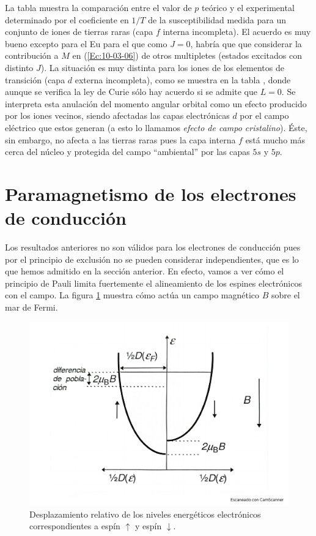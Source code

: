 La tabla muestra la comparación entre el valor de $p$ teórico y el experimental determinado por el coeficiente en $1/T$ de la susceptibilidad medida para un conjunto de iones de tierras raras (capa $f$ interna incompleta). El acuerdo es muy  bueno excepto para el Eu para el que como $J=0$, habría que que considerar la contribución a $M$ en (\ref{Ec:10-03-06}) de otros multipletes (estados excitados con distinto $J$). La situación es muy distinta para los iones de los elementos de transición (capa $d$ externa incompleta), como se muestra en la tabla , donde aunque se verifica la ley de Curie sólo hay acuerdo si se admite que $L=0$. Se interpreta esta anulación del momento angular orbital como un efecto producido por los iones vecinos, siendo afectadas las capas electrónicas $d$ por el campo eléctrico que estos generan (a esto lo llamamos \textit{efecto de campo cristalino}). Éste, sin embargo, no afecta a las tierras raras pues la capa interna $f$ está mucho más cerca del núcleo y protegida del campo ``ambiental'' por las capas $5s$ y $5p$.


\section{Paramagnetismo de los electrones de conducción}

Los resultados anteriores no son válidos para los electrones de conducción pues por el principio de exclusión no se pueden considerar independientes, que es lo que hemos admitido en la sección anterior. En efecto, vamos a ver cómo el principio de Pauli limita fuertemente el alineamiento de los espines electrónicos con el campo. La figura \ref{Fig:10-03} muestra cómo actúa un campo magnético $B$ sobre el mar de Fermi.

\begin{figure}[h!] \centering
	\includegraphics[scale=0.35]{Cuerpo/Ch_10/Fotos libro 3.pdf}
	\caption{Desplazamiento relativo de los niveles energéticos electrónicos correspondientes a espín $\uparrow$ y espín $\downarrow$.}
	\label{Fig:10-03}
\end{figure}

